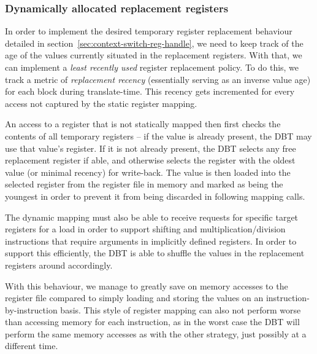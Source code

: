 \subsubsection{Dynamically allocated replacement registers}
\label{sec:lazy-replace-details}
In order to implement the desired temporary register replacement behaviour detailed in section~\ref{sec:context-switch-reg-handle}, we need to keep track of the age of the values currently situated in the replacement registers.
With that, we can implement a \textit{least recently used} register replacement policy.
To do this, we track a metric of \textit{replacement recency} (essentially serving as an inverse value age) for each block during translate-time.
This recency gets incremented for every access not captured by the static register mapping.

An access to a register that is not statically mapped then first checks the contents of all temporary registers -- if the value is already present, the DBT may use that value's register.
If it is not already present, the DBT selects any free replacement register if able, and otherwise selects the register with the oldest value (or minimal recency) for write-back.
The value is then loaded into the selected register from the register file in memory and marked as being the youngest in order to prevent it from being discarded in following mapping calls.

The dynamic mapping must also be able to receive requests for specific target registers for a load in order to support shifting and multiplication/division instructions that require arguments in implicitly defined registers.
In order to support this efficiently, the DBT is able to shuffle the values in the replacement registers around accordingly.

With this behaviour, we manage to greatly save on memory accesses to the register file compared to simply loading and storing the values on an instruction-by-instruction basis.
This style of register mapping can also not perform worse than accessing memory for each instruction, as in the worst case the DBT will perform the same memory accesses as with the other strategy, just possibly at a different time.

